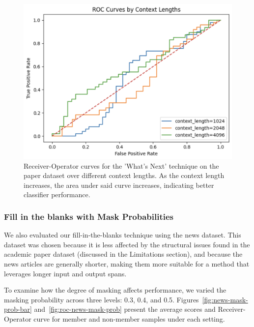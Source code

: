 \documentclass[sigconf]{acmart}
\begin{document}
\begin{figure}[htp]
  \centering
  \includegraphics[width=\columnwidth]{figures/roc_gpt_context_length.png}
    \caption{Receiver-Operator curves for the 'What's Next' technique on the paper dataset over different context lengths. As the context length increases, the area under said curve increases, indicating better classifier performance.}
    \label{fig:roc-paper-completion-context-length}
\end{figure}

\subsubsection{Fill in the blanks with Mask Probabilities}

We also evaluated our fill-in-the-blanks technique using the news dataset. This dataset was chosen because it is less affected by the structural issues found in the academic paper dataset (discussed in the Limitations section), and because the news articles are generally shorter, making them more suitable for a method that leverages longer input and output spans.

To examine how the degree of masking affects performance, we varied the masking probability across three levels: 0.3, 0.4, and 0.5. Figures~\ref{fig:news-mask-prob-bar} and~\ref{fig:roc-news-mask-prob} present the average scores and Receiver-Operator curve for member and non-member samples under each setting.
\end{document}
